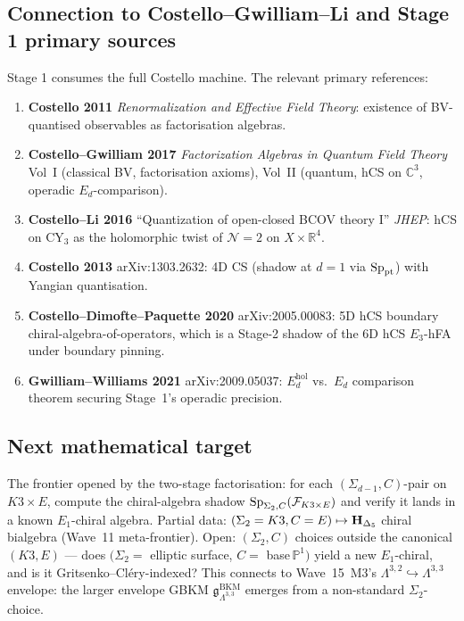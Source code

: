 \subsection{Connection to Costello--Gwilliam--Li and Stage 1 primary sources}
\label{wn:subsec:stage-1-primary-sources}

Stage 1 consumes the full Costello machine. The relevant primary references:
\begin{enumerate}
\item \textbf{Costello 2011} \emph{Renormalization and Effective Field Theory}:
existence of BV-quantised observables as factorisation algebras.
\item \textbf{Costello--Gwilliam 2017} \emph{Factorization Algebras in
Quantum Field Theory} Vol~I (classical BV, factorisation axioms),
Vol~II (quantum, hCS on $\mathbb{C}^3$, operadic $E_d$-comparison).
\item \textbf{Costello--Li 2016} ``Quantization of open-closed BCOV theory
I'' \emph{JHEP}: hCS on CY$_3$ as the holomorphic twist of
$\mathcal{N} = 2$ on $X \times \mathbb{R}^4$.
\item \textbf{Costello 2013} arXiv:1303.2632: 4D CS (shadow at $d=1$ via
$\mathrm{Sp}_{\mathrm{pt}}$) with Yangian quantisation.
\item \textbf{Costello--Dimofte--Paquette 2020} arXiv:2005.00083: 5D hCS
boundary chiral-algebra-of-operators, which is a Stage-2 shadow of the
6D hCS $E_3$-hFA under boundary pinning.
\item \textbf{Gwilliam--Williams 2021} arXiv:2009.05037:
$E_d^{\mathrm{hol}}$ vs.\ $E_d$ comparison theorem securing Stage~1's
operadic precision.
\end{enumerate}

\subsection{Next mathematical target}
\label{wn:subsec:two-stage-next-target}

The frontier opened by the two-stage factorisation: for each
$(\Sigma_{d-1}, C)$-pair on $K3 \times E$, compute the chiral-algebra shadow
$\mathrm{Sp}_{\Sigma_2, C}(\mathcal{F}_{K3\times E})$ and verify it lands in a
known $E_1$-chiral algebra. Partial data:
$(\Sigma_2 = K3, C = E) \mapsto \mathbf{H}_{\Delta_5}$ chiral bialgebra (Wave~11
meta-frontier). Open: $(\Sigma_2, C)$ choices outside the canonical
$(K3, E)$ --- does $(\Sigma_2 = $ elliptic surface, $C = $ base$\,\mathbb{P}^1)$
yield a new $E_1$-chiral, and is it Gritsenko--Cléry-indexed? This
connects to Wave~15~M3's $\Lambda^{3,2} \hookrightarrow \Lambda^{3,3}$
envelope: the larger envelope GBKM $\mathfrak{g}^{\mathrm{BKM}}_{\Lambda^{3,3}}$
emerges from a non-standard $\Sigma_2$-choice.
